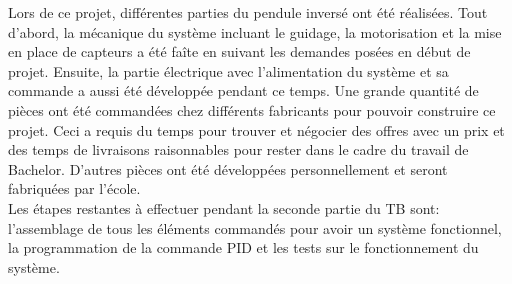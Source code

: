 Lors de ce projet, différentes parties du pendule inversé ont été réalisées. Tout d'abord, la mécanique du système incluant le guidage, la motorisation
et la mise en place de capteurs a été faîte en suivant les demandes posées en début de projet. Ensuite, la partie électrique avec l'alimentation du
système et sa commande a aussi été développée pendant ce temps. Une grande quantité de pièces ont été commandées chez différents fabricants pour
pouvoir construire ce projet. Ceci a requis du temps pour trouver et négocier des offres avec un prix et des temps de livraisons raisonnables
pour rester dans le cadre du travail de Bachelor. D'autres pièces ont été développées personnellement et seront fabriquées par l'école.\\

Les étapes restantes à effectuer pendant la seconde partie du \acrshort{TB} sont: l'assemblage de tous les éléments commandés pour avoir un
système fonctionnel, la programmation de la commande \gls{PID} et les tests sur le fonctionnement du système.